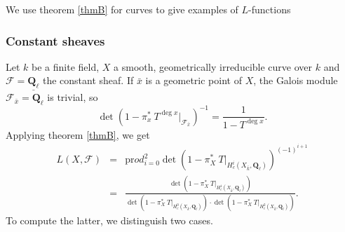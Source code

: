 We use theorem \ref{thmB} for curves to give examples of $L$-functions

\subsubsection*{Constant sheaves} 

Let $k$ be a finite field, $X$ a smooth, geometrically irreducible curve over $k$ and $\mathcal{F} = \underline{\mathbf{Q}_\ell}$ the constant sheaf. If $\bar x$ is a geometric point of $X$, the Galois module $\mathcal{F}_{\bar x} = \mathbf{Q}_\ell$ is trivial, so  
$$
\det\left(1-\pi_x^*\ T^{\deg x}\Big|_{\mathcal{F}_{\bar x}}\right)^{-1} = \frac{1}{1-T^{\deg x}}.
$$
Applying theorem \ref{thmB}, we get
\begin{eqnarray*}
L(X, \mathcal{F}) & = & \text{pr}od_{i=0}^2 \det\left(1-\pi_X^*\ T\big|_{H_c^i(X_{\bar k}, \mathbf{Q}_\ell)}\right)^{(-1)^{i+1}} \\
& = & 
\frac{\det\left(1-\pi_X^*\ T\big|_{H_c^1(X_{\bar k}, \mathbf{Q}_\ell)}\right)}{\det\left(1-\pi_X^*\ T\big|_{H_c^0(X_{\bar k}, \mathbf{Q}_\ell)}\right)\cdot\det\left(1-\pi_X^*\ T\big|_{H_c^2(X_{\bar k}, \mathbf{Q}_\ell)}\right)}.
\end{eqnarray*}
To compute the latter, we distinguish two cases.
